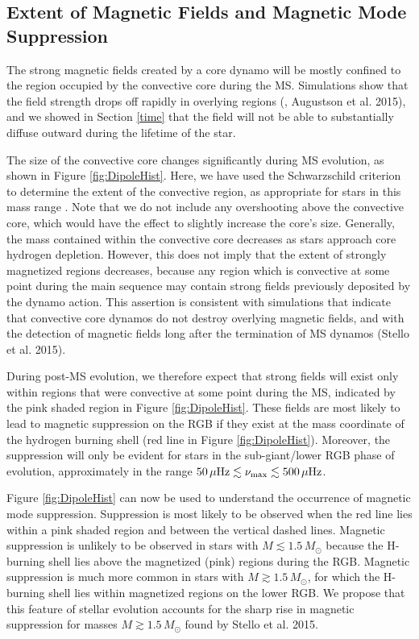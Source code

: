 \subsection{Extent of Magnetic Fields and Magnetic Mode Suppression}
\label{rgb}

The strong magnetic fields created by a core dynamo will be mostly confined to the region occupied by the convective core during the MS. Simulations show that the field strength drops off rapidly in overlying regions (\citealt{Featherstone_2009}, Augustson et al. 2015), and we showed in Section \ref{time} that the field will not be able to substantially diffuse outward during the lifetime of the star. 

The size of the convective core changes significantly during MS evolution, as shown in Figure \ref{fig:DipoleHist}. Here, we have used the Schwarzschild criterion to determine the extent of the convective region, as appropriate for stars in this mass range \citep{Moore_2015}. Note that we do not include any  overshooting above the convective core, which would have the effect to slightly increase the core's size. Generally, the mass contained within the convective core decreases as stars approach core hydrogen depletion. However, this does not imply that the extent of strongly magnetized regions decreases, because any region which is convective at some point during the main sequence may contain strong fields previously deposited by the dynamo action. This assertion is consistent with simulations \citep{Featherstone_2009} that indicate that convective core dynamos do not destroy overlying magnetic fields, and with the detection of magnetic fields long after the termination of MS dynamos (Stello et al. 2015).

During post-MS evolution, we therefore expect that strong fields will exist only within regions that were convective at some point during the MS, indicated by the pink shaded region in Figure \ref{fig:DipoleHist}. These fields are most likely to lead to magnetic suppression on the RGB if they exist at the mass coordinate of the hydrogen burning shell (red line in Figure \ref{fig:DipoleHist}). Moreover, the suppression will only be evident for stars in the sub-giant/lower RGB phase of evolution, approximately in the range $50 \, \mu {\rm Hz} \lesssim \nu_{\rm max} \lesssim 500 \, \mu {\rm Hz}$.

Figure \ref{fig:DipoleHist} can now be used to understand the occurrence of magnetic mode suppression. Suppression is most likely to be observed when the red line lies within a pink shaded region and between the vertical dashed lines. Magnetic suppression is unlikely to be observed in stars with $M \lesssim 1.5 \, M_\odot$ because the H-burning shell lies above the magnetized (pink) regions during the RGB. Magnetic suppression is much more common in stars with $M \gtrsim 1.5 \, M_\odot$, for which the H-burning shell lies within magnetized regions on the lower RGB. We propose that this feature of stellar evolution accounts for the sharp rise in magnetic suppression for masses $M \gtrsim 1.5 \, M_\odot$ found by Stello et al. 2015.

    
    
  
  